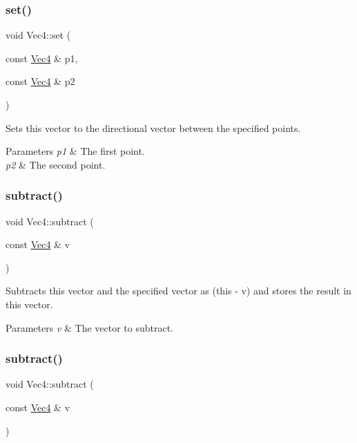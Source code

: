 \subsubsection{\texorpdfstring{set()}{set()}\hspace{0.1cm}{\footnotesize\ttfamily [8/8]}}
{\footnotesize\ttfamily void Vec4\+::set (\begin{DoxyParamCaption}\item[{const \hyperlink{classVec4}{Vec4} \&}]{p1,  }\item[{const \hyperlink{classVec4}{Vec4} \&}]{p2 }\end{DoxyParamCaption})}

Sets this vector to the directional vector between the specified points.


\begin{DoxyParams}{Parameters}
{\em p1} & The first point. \\
\hline
{\em p2} & The second point. \\
\hline
\end{DoxyParams}
\mbox{\label{classVec4_a8a43b0370837df064167d3dcca9c8952}} 
\subsubsection{\texorpdfstring{subtract()}{subtract()}\hspace{0.1cm}{\footnotesize\ttfamily [1/4]}}
{\footnotesize\ttfamily void Vec4\+::subtract (\begin{DoxyParamCaption}\item[{const \hyperlink{classVec4}{Vec4} \&}]{v }\end{DoxyParamCaption})}

Subtracts this vector and the specified vector as (this -\/ v) and stores the result in this vector.


\begin{DoxyParams}{Parameters}
{\em v} & The vector to subtract. \\
\hline
\end{DoxyParams}
\mbox{\label{classVec4_a8a43b0370837df064167d3dcca9c8952}} 
\subsubsection{\texorpdfstring{subtract()}{subtract()}\hspace{0.1cm}{\footnotesize\ttfamily [2/4]}}
{\footnotesize\ttfamily void Vec4\+::subtract (\begin{DoxyParamCaption}\item[{const \hyperlink{classVec4}{Vec4} \&}]{v }\end{DoxyParamCaption})}

